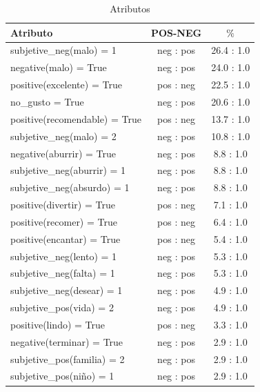 \documentclass[12pt]{article}
\begin{document}
\begin{table}[!htb]
\begin{center}
\begin{tabular}{|l|c|c|} 
\hline
 \multicolumn{1}{|l}{Atributo}&
 \multicolumn{1}{|c}{POS-NEG}&
 \multicolumn{1}{|c|}{$\%$}
\tabularnewline
  \hline
    subjetive\_neg(malo) = 1         &        neg : pos    &     26.4 : 1.0 \\ \hline
          negative(malo) = True     &         neg : pos    &     24.0 : 1.0 \\ \hline
     positive(excelente) = True     &         pos : neg    &     22.5 : 1.0 \\ \hline
                no\_gusto = True     &         neg : pos    &     20.6 : 1.0 \\ \hline
  positive(recomendable) = True      &        pos : neg    &     13.7 : 1.0 \\ \hline
     subjetive\_neg(malo) = 2         &        neg : pos    &     10.8 : 1.0 \\ \hline
       negative(aburrir) = True      &        neg : pos    &      8.8 : 1.0 \\ \hline
  subjetive\_neg(aburrir) = 1         &        neg : pos    &      8.8 : 1.0 \\ \hline
  subjetive\_neg(absurdo) = 1         &        neg : pos    &      8.8 : 1.0 \\ \hline
      positive(divertir) = True      &        pos : neg    &      7.1 : 1.0 \\ \hline
       positive(recomer) = True      &        pos : neg    &      6.4 : 1.0 \\ \hline
      positive(encantar) = True      &        pos : neg    &      5.4 : 1.0 \\ \hline
    subjetive\_neg(lento) = 1         &        neg : pos    &      5.3 : 1.0 \\ \hline
    subjetive\_neg(falta) = 1         &        neg : pos    &      5.3 : 1.0 \\ \hline
   subjetive\_neg(desear) = 1         &        neg : pos    &      4.9 : 1.0 \\ \hline
     subjetive\_pos(vida) = 2         &        neg : pos    &      4.9 : 1.0 \\ \hline
         positive(lindo) = True      &        pos : neg    &      3.3 : 1.0 \\ \hline
      negative(terminar) = True      &        neg : pos    &      2.9 : 1.0 \\ \hline
  subjetive\_pos(familia) = 2         &        neg : pos    &      2.9 : 1.0 \\ \hline
     subjetive\_pos(niño) = 1         &        neg : pos    &      2.9 : 1.0 \\ \hline

\end{tabular} 
\end{center}
\caption{Atributos} 
\label{tabla:atributos}
\end{table}
\end{document}

